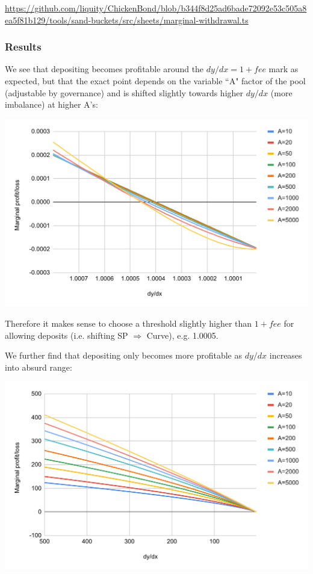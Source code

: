 \documentclass{article}
\begin{document}
\url{https://github.com/liquity/ChickenBond/blob/b344f8d25ad6bade72092e53c505a8ea5f81b129/tools/sand-buckets/src/sheets/marginal-withdrawal.ts}

\subsubsection{Results}

We see that depositing becomes profitable around the $dy/dx = 1+fee$ mark as expected, but that the exact point depends on the variable ``A" factor of the pool (adjustable by governance) and is shifted slightly towards higher $dy/dx$ (more imbalance) at higher A's:

\includegraphics[width=\linewidth]{./LUSDChickenBonds_Shifting_Profitability_1.png}

Therefore it makes sense to choose a threshold slightly higher than $1+fee$ for allowing deposits (i.e. shifting SP $\Rightarrow$ Curve), e.g. 1.0005.

We further find that depositing only becomes more profitable as $dy/dx$ increases into absurd range:

\includegraphics[width=\linewidth]{./LUSDChickenBonds_Shifting_Profitability_2.png}
\end{document}
